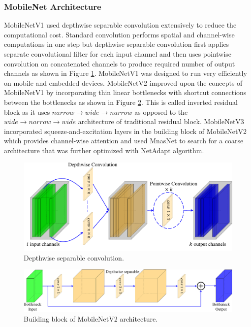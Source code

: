 \subsubsection{MobileNet Architecture}
MobileNetV1 \cite{Howard2017} used depthwise separable convolution extensively to reduce the computational cost. Standard convolution performs spatial and channel-wise computations in one step but depthwise separable convolution first applies separate convolutional filter for each input channel and then uses pointwise convolution on concatenated channels to produce required number of output channels as shown in Figure \ref{fig:depthwise}. MobileNetV1 was designed to run very efficiently on mobile and embedded devices. MobileNetV2 \cite{Sandler2018} improved upon the concepts of MobileNetV1 by incorporating thin linear bottlenecks with shortcut connections between the bottlenecks as shown in Figure \ref{fig:mobilenetv2}. This is called inverted residual block as it uses $narrow\rightarrow wide \rightarrow narrow$ as opposed to the $wide\rightarrow narrow \rightarrow wide$ architecture of traditional residual block. MobileNetV3 \cite{Howard2019} incorporated squeeze-and-excitation layers \cite{Hu2020} in the building block of MobileNetV2 which provides channel-wise attention and used MnasNet \cite{Tan2019} to search for a coarse architecture that was further optimized with NetAdapt \cite{Yang2018} algorithm.
\begin{figure}[htb!]
	\centering
	\includegraphics[width=\textwidth,keepaspectratio]{images/pretraining/depthwise-cropped.pdf}
	\caption[Depthwise separable convolution]{Depthwise separable convolution.}
	\label{fig:depthwise}
\end{figure}
\begin{figure}[htb!]
	\centering
	\includegraphics[width=\textwidth,keepaspectratio]{images/pretraining/mnetv2-cropped.pdf}
	\caption[Building block of MobileNetV2 architecture]{Building block of MobileNetV2 architecture.}
	\label{fig:mobilenetv2}
\end{figure}

